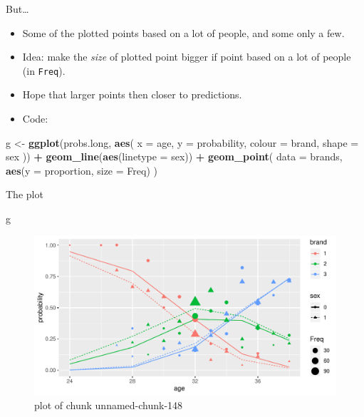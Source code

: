 \documentclass[ignorenonframetext,]{beamer}
\newenvironment{Shaded}{\begin{snugshade}}{\end{snugshade}}
\newcommand{\DataTypeTok}[1]{\textcolor[rgb]{0.13,0.29,0.53}{#1}}
\newcommand{\KeywordTok}[1]{\textcolor[rgb]{0.13,0.29,0.53}{\textbf{#1}}}
\newcommand{\NormalTok}[1]{#1}
\newcommand{\OperatorTok}[1]{\textcolor[rgb]{0.81,0.36,0.00}{\textbf{#1}}}
\newcommand{\StringTok}[1]{\textcolor[rgb]{0.31,0.60,0.02}{#1}}
\begin{document}
\begin{frame}[fragile]{But\ldots}
\protect\hypertarget{but-1}{}

\begin{itemize}
\item
  Some of the plotted points based on a lot of people, and some only a
  few.
\item
  Idea: make the \emph{size} of plotted point bigger if point based on a
  lot of people (in \texttt{Freq}).
\item
  Hope that larger points then closer to predictions.
\item
  Code:
\end{itemize}

\footnotesize

\begin{Shaded}
\begin{Highlighting}[]
\NormalTok{g <-}\StringTok{ }\KeywordTok{ggplot}\NormalTok{(probs.long, }\KeywordTok{aes}\NormalTok{(}
  \DataTypeTok{x =}\NormalTok{ age, }\DataTypeTok{y =}\NormalTok{ probability,}
  \DataTypeTok{colour =}\NormalTok{ brand, }\DataTypeTok{shape =}\NormalTok{ sex}
\NormalTok{)) }\OperatorTok{+}
\StringTok{  }\KeywordTok{geom_line}\NormalTok{(}\KeywordTok{aes}\NormalTok{(}\DataTypeTok{linetype =}\NormalTok{ sex)) }\OperatorTok{+}
\StringTok{  }\KeywordTok{geom_point}\NormalTok{(}
    \DataTypeTok{data =}\NormalTok{ brands,}
    \KeywordTok{aes}\NormalTok{(}\DataTypeTok{y =}\NormalTok{ proportion, }\DataTypeTok{size =}\NormalTok{ Freq)}
\NormalTok{  )}
\end{Highlighting}
\end{Shaded}

\normalsize

\end{frame}

\begin{frame}[fragile]{The plot}
\protect\hypertarget{the-plot-3}{}

\begin{Shaded}
\begin{Highlighting}[]
\NormalTok{g}
\end{Highlighting}
\end{Shaded}

\begin{figure}
\centering
\includegraphics{figure/unnamed-chunk-148-1.pdf}
\caption{plot of chunk unnamed-chunk-148}
\end{figure}

\end{frame}
\end{document}
